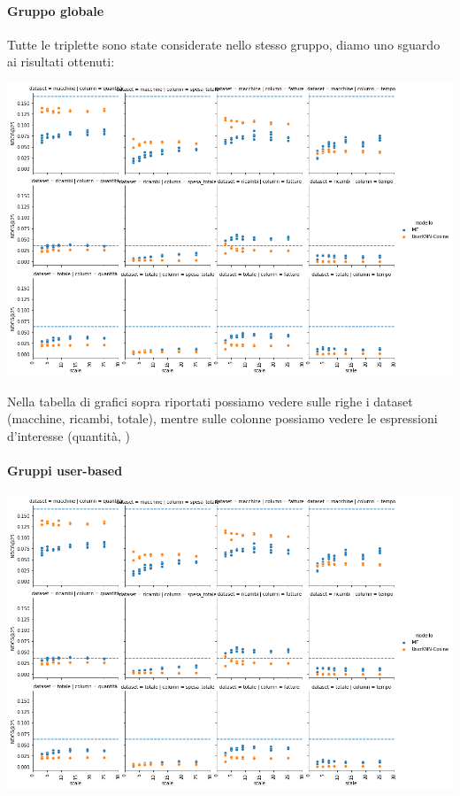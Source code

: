 \paragraph{Gruppo globale}
Tutte le triplette sono state considerate nello stesso gruppo, diamo uno sguardo ai risultati ottenuti:

\includegraphics[width=16cm]{figures/risultati_minmax_globale.png}

Nella tabella di grafici sopra riportati possiamo vedere sulle righe i dataset (macchine, ricambi, totale), mentre sulle colonne possiamo vedere le espressioni d'interesse (quantità, )

\paragraph{Gruppi user-based}

\includegraphics[width=16cm]{figures/risultati_minmax_singolo.png}


